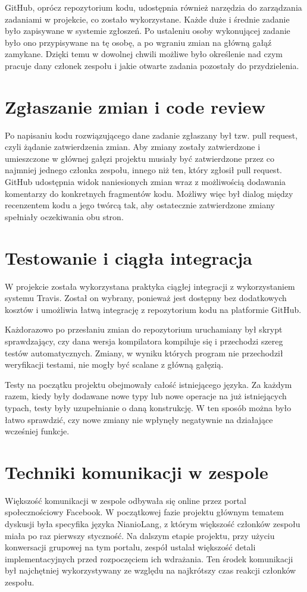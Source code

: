 \documentclass[licencjacka]{pracamgr}
\begin{document}
GitHub, oprócz repozytorium kodu, udostępnia również narzędzia do zarządzania zadaniami
w projekcie, co zostało wykorzystane. Każde duże i średnie zadanie było zapisywane
w systemie zgłoszeń. Po ustaleniu osoby wykonującej zadanie było ono przypisywane
na tę osobę, a po wgraniu zmian na główną gałąź zamykane.
Dzięki temu w dowolnej chwili możliwe było określenie nad czym pracuje dany członek
zespołu i jakie otwarte zadania pozostały do przydzielenia.

\section{Zgłaszanie zmian i code review}
Po napisaniu kodu rozwiązującego dane zadanie zgłaszany był tzw. pull request,
czyli żądanie zatwierdzenia zmian. Aby zmiany zostały zatwierdzone i umieszczone
w głównej gałęzi projektu musiały być zatwierdzone przez co najmniej jednego członka
zespołu, innego niż ten, który zgłosił pull request. GitHub udostępnia widok naniesionych zmian
wraz z możliwością dodawania komentarzy do konkretnych fragmentów kodu. Możliwy więc
był dialog między recenzentem kodu a jego twórcą tak, aby ostatecznie zatwierdzone
zmiany spełniały oczekiwania obu stron.

\section{Testowanie i ciągła integracja}
W projekcie została wykorzystana praktyka ciągłej integracji z wykorzystaniem systemu Travis.
Został on wybrany, ponieważ jest dostępny bez dodatkowych kosztów i umożliwia łatwą integrację z repozytorium kodu
na platformie GitHub.

Każdorazowo po przesłaniu zmian do repozytorium uruchamiany był skrypt sprawdzający, czy dana wersja kompilatora
kompiluje się i przechodzi szereg testów automatycznych.
Zmiany, w wyniku których program nie przechodził weryfikacji testami, nie mogły być scalane z główną gałęzią.

Testy na początku projektu obejmowały całość istniejącego języka.
Za każdym razem, kiedy były dodawane nowe typy lub nowe operacje na już istniejących typach,
testy były uzupełnianie o daną konstrukcję.
W ten sposób można było łatwo sprawdzić, czy nowe zmiany nie wpłynęły negatywnie na działające wcześniej funkcje.

\section{Techniki komunikacji w zespole}
Większość komunikacji w zespole odbywała się online przez portal społecznościowy Facebook.
W początkowej fazie projektu głównym tematem dyskusji była specyfika języka NianioLang,
z którym większość członków zespołu miała po raz pierwszy styczność.
Na dalszym etapie projektu, przy użyciu konwersacji grupowej na tym portalu, zespół
ustalał większość detali implementacyjnych przed rozpoczęciem ich wdrażania.
Ten środek komunikacji był najchętniej wykorzystywany ze względu na najkrótszy czas
reakcji członków zespołu.
\end{document}
